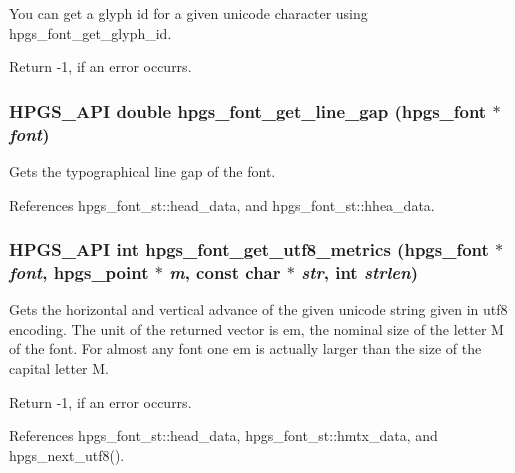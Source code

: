 You can get a glyph id for a given unicode character using {\ttfamily hpgs\_\-font\_\-get\_\-glyph\_\-id}.

Return -\/1, if an error occurrs. 
\subsubsection[{hpgs\_\-font\_\-get\_\-line\_\-gap}]{\setlength{\rightskip}{0pt plus 5cm}HPGS\_\-API double hpgs\_\-font\_\-get\_\-line\_\-gap ({\bf hpgs\_\-font} $\ast$ {\em font})}\label{group__font_ga77ba5973c88e0087b0f1ee41c37ff555}
Gets the typographical line gap of the font. 

References hpgs\_\-font\_\-st::head\_\-data, and hpgs\_\-font\_\-st::hhea\_\-data.

\subsubsection[{hpgs\_\-font\_\-get\_\-utf8\_\-metrics}]{\setlength{\rightskip}{0pt plus 5cm}HPGS\_\-API int hpgs\_\-font\_\-get\_\-utf8\_\-metrics ({\bf hpgs\_\-font} $\ast$ {\em font}, \/  {\bf hpgs\_\-point} $\ast$ {\em m}, \/  const char $\ast$ {\em str}, \/  int {\em strlen})}\label{group__font_gac2265b0afa11970e7d15dd0c746ce1a3}
Gets the horizontal and vertical advance of the given unicode string given in utf8 encoding. The unit of the returned vector is em, the nominal size of the letter M of the font. For almost any font one em is actually larger than the size of the capital letter M.

Return -\/1, if an error occurrs. 

References hpgs\_\-font\_\-st::head\_\-data, hpgs\_\-font\_\-st::hmtx\_\-data, and hpgs\_\-next\_\-utf8().

